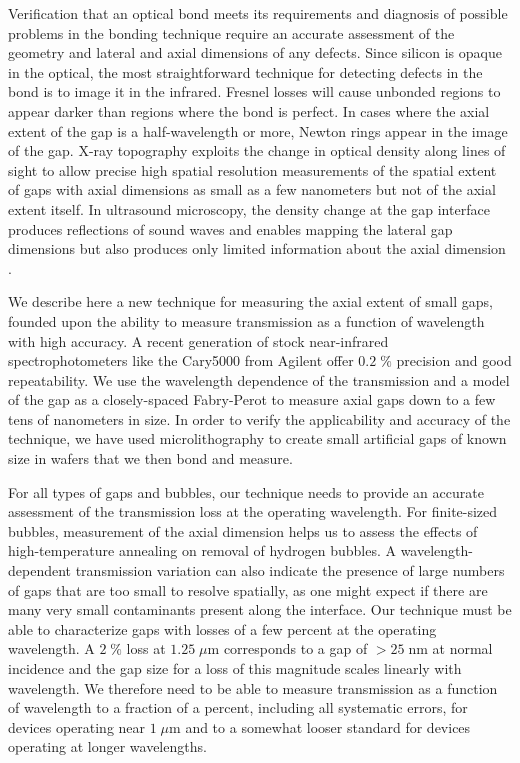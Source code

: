 Verification that an optical bond meets its requirements and diagnosis of possible problems in the bonding technique require an accurate assessment of the geometry and lateral and axial dimensions of any defects.  Since silicon is opaque in the optical, the most straightforward technique for detecting defects in the bond is to image it in the infrared.  Fresnel losses will cause unbonded regions to appear darker than regions where the bond is perfect.  In cases where the axial extent of the gap is a half-wavelength or more, Newton rings appear in the image of the gap.  X-ray topography \cite{Mitani1990} exploits the change in optical density along lines of sight to allow precise high spatial resolution measurements of the spatial extent of gaps with axial dimensions as small as a few nanometers but not of the axial extent itself. In ultrasound microscopy, the density change at the gap interface produces reflections of sound waves and enables mapping the lateral gap dimensions but also produces only limited information about the axial dimension \cite{2000RScI...71.1869G}.


We describe here a new technique for measuring the axial extent of small gaps, founded upon the ability to measure transmission as a function of wavelength with high accuracy.   A recent generation of stock near-infrared spectrophotometers like the Cary5000 from Agilent offer $0.2\;\%$ precision and good repeatability.  We use the wavelength dependence of the transmission and a model of the gap as a closely-spaced Fabry-Perot to measure axial gaps down to a few tens of nanometers in size.  In order to verify the applicability and accuracy of the technique, we have used microlithography to create small artificial gaps of known size in wafers that we then bond and measure.


For all types of gaps and bubbles, our technique needs to provide an accurate assessment of the transmission loss at the operating wavelength.  For finite-sized bubbles, measurement of the axial dimension helps us to assess the effects of high-temperature annealing \cite{Horn2009, Masteika2014} on removal of hydrogen bubbles.  A wavelength-dependent transmission variation can also indicate the presence of large numbers of gaps that are too small to resolve spatially, as one might expect if there are many very small contaminants present along the interface.  Our technique must be able to characterize gaps with losses of a few percent at the operating wavelength.  A $2\;\%$ loss at $1.25\;\mu$m corresponds to a gap of $>25\;$nm at normal incidence and the gap size for a loss of this magnitude scales linearly with wavelength.  We therefore need to be able to measure transmission as a function of wavelength to a fraction of a percent, including all systematic errors, for devices operating near $1\;\mu$m and to a somewhat looser standard for devices operating at longer wavelengths.


